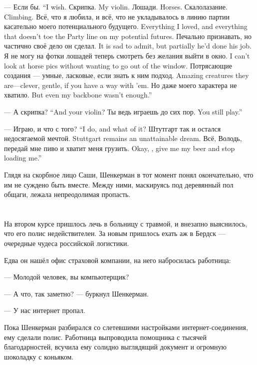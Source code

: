 {--- Если бы.}
{``I wish.}
{Скрипка.}
{My violin.}
{Лошади.}
{Horses.}
{Скалолазание.}
{Climbing.}
{Всё, что я любила, и всё, что не укладывалось в линию партии касательно моего потенциального будущего.}
{Everything I loved, and everything that doesn't toe the Party line on my potential futures.}
{Печально признавать, но частично своё дело он сделал.}
{It is sad to admit, but partially he'd done his job.}
{Я не могу на фотки лошадей теперь смотреть без желания выйти в окно.}
{I can't look at horse pics without wanting to go out of the window.}
{Потрясающие создания --- умные, ласковые, если знать к ним подход.}
{Amazing creatures they are---clever, gentle, if you have a way with 'em.}
{Но даже моего характера не хватило.}
{But even my backbone wasn't enough.''}

{--- А скрипка?}
{``And your violin?}
{Ты ведь играешь до сих пор.}
{You still play.''}

{--- Играю, и что с того?}
{``I do, and what of it?}
{Штутгарт так и остался недосягаемой мечтой.}
{Stuttgart remains an unattainable dream.}
{Всё, Володь, передай мне пиво и хватит меня грузить.}
{Okay, \Volod, give me my beer and stop loading me.''}

Глядя на скорбное лицо Саши, Шенкерман в тот момент понял окончательно, что им не суждено быть вместе.
Между ними, маскируясь под деревянный пол общаги, лежала непреодолимая пропасть.

\chapter{}

\textspace

На втором курсе пришлось лечь в больницу с травмой, и внезапно выяснилось, что его полис недействителен.
За новым пришлось ехать аж в Бердск --- очередные чудеса российской логистики.

Едва он нашёл офис страховой компании, на него набросилась работница:

--- Молодой человек, вы компьютерщик?

--- А что, так заметно? --- буркнул Шенкерман.

--- У нас интернет пропал.

Пока Шенкерман разбирался со слетевшими настройками интернет-соединения, ему сделали полис.
Работница выпроводила помощника с тысячей благодарностей, всучила ему солидно выглядящий документ и огромную шоколадку с коньяком.

